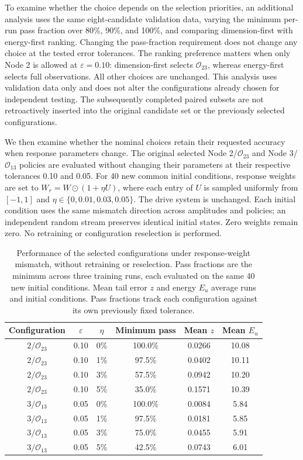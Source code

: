 To examine whether the choice depends on the selection priorities, an additional analysis uses the same eight-candidate validation data, varying the minimum per-run pass fraction over 80\%, 90\%, and 100\%, and comparing dimension-first with energy-first ranking. Changing the pass-fraction requirement does not change any choice at the tested error tolerances. The ranking preference matters when only Node 2 is allowed at $\varepsilon=0.10$: dimension-first selects $\mathcal O_{23}$, whereas energy-first selects full observations. All other choices are unchanged. This analysis uses validation data only and does not alter the configurations already chosen for independent testing. The subsequently completed paired subsets are not retroactively inserted into the original candidate set or the previously selected configurations.

We then examine whether the nominal choices retain their requested accuracy when response parameters change. The original selected Node 2/$\mathcal O_{23}$ and Node 3/$\mathcal O_{13}$ policies are evaluated without changing their parameters at their respective tolerances 0.10 and 0.05. For 40 new common initial conditions, response weights are set to $W_r=W\odot(1+\eta U)$, where each entry of $U$ is sampled uniformly from $[-1,1]$ and $\eta\in\{0,0.01,0.03,0.05\}$. The drive system is unchanged. Each initial condition uses the same mismatch direction across amplitudes and policies; an independent random stream preserves identical initial states. Zero weights remain zero. No retraining or configuration reselection is performed.

\begin{table}[pos=!t,width=\textwidth]
\centering
\caption{Performance of the selected configurations under response-weight mismatch, without retraining or reselection. Pass fractions are the minimum across three training runs, each evaluated on the same 40 new initial conditions. Mean tail error $z$ and energy $E_u$ average runs and initial conditions. Pass fractions track each configuration against its own previously fixed tolerance.}
\label{tab:configuration_transfer}
\small
\begin{tabular}{cccccc}
\toprule
Configuration & $\varepsilon$ & $\eta$ & Minimum pass & Mean $z$ & Mean $E_u$\\
\midrule
$2/\mathcal O_{23}$ & 0.10 & 0\% & 100.0\% & 0.0266 & 10.08\\
$2/\mathcal O_{23}$ & 0.10 & 1\% & 97.5\% & 0.0402 & 10.11\\
$2/\mathcal O_{23}$ & 0.10 & 3\% & 57.5\% & 0.0942 & 10.20\\
$2/\mathcal O_{23}$ & 0.10 & 5\% & 35.0\% & 0.1571 & 10.39\\
$3/\mathcal O_{13}$ & 0.05 & 0\% & 100.0\% & 0.0084 & 5.84\\
$3/\mathcal O_{13}$ & 0.05 & 1\% & 97.5\% & 0.0181 & 5.85\\
$3/\mathcal O_{13}$ & 0.05 & 3\% & 75.0\% & 0.0455 & 5.91\\
$3/\mathcal O_{13}$ & 0.05 & 5\% & 42.5\% & 0.0743 & 6.01\\
\bottomrule
\end{tabular}
\end{table}

